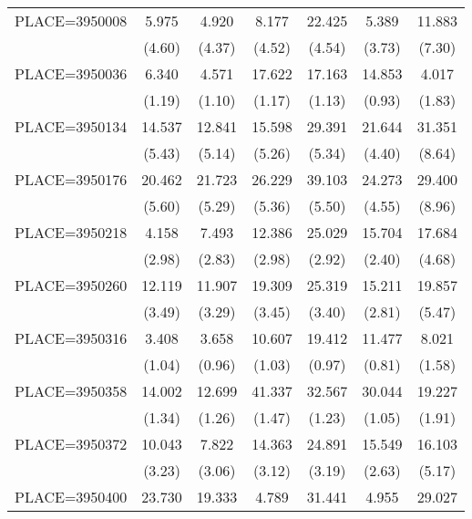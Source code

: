 {\begin{tabular}{l*{6}{c}}
PLACE=3950008       &       5.975&       4.920&       8.177&      22.425&       5.389&      11.883\\
                    &      (4.60)&      (4.37)&      (4.52)&      (4.54)&      (3.73)&      (7.30)\\
PLACE=3950036       &       6.340&       4.571&      17.622&      17.163&      14.853&       4.017\\
                    &      (1.19)&      (1.10)&      (1.17)&      (1.13)&      (0.93)&      (1.83)\\
PLACE=3950134       &      14.537&      12.841&      15.598&      29.391&      21.644&      31.351\\
                    &      (5.43)&      (5.14)&      (5.26)&      (5.34)&      (4.40)&      (8.64)\\
PLACE=3950176       &      20.462&      21.723&      26.229&      39.103&      24.273&      29.400\\
                    &      (5.60)&      (5.29)&      (5.36)&      (5.50)&      (4.55)&      (8.96)\\
PLACE=3950218       &       4.158&       7.493&      12.386&      25.029&      15.704&      17.684\\
                    &      (2.98)&      (2.83)&      (2.98)&      (2.92)&      (2.40)&      (4.68)\\
PLACE=3950260       &      12.119&      11.907&      19.309&      25.319&      15.211&      19.857\\
                    &      (3.49)&      (3.29)&      (3.45)&      (3.40)&      (2.81)&      (5.47)\\
PLACE=3950316       &       3.408&       3.658&      10.607&      19.412&      11.477&       8.021\\
                    &      (1.04)&      (0.96)&      (1.03)&      (0.97)&      (0.81)&      (1.58)\\
PLACE=3950358       &      14.002&      12.699&      41.337&      32.567&      30.044&      19.227\\
                    &      (1.34)&      (1.26)&      (1.47)&      (1.23)&      (1.05)&      (1.91)\\
PLACE=3950372       &      10.043&       7.822&      14.363&      24.891&      15.549&      16.103\\
                    &      (3.23)&      (3.06)&      (3.12)&      (3.19)&      (2.63)&      (5.17)\\
PLACE=3950400       &      23.730&      19.333&       4.789&      31.441&       4.955&      29.027\\

\end{tabular}}
